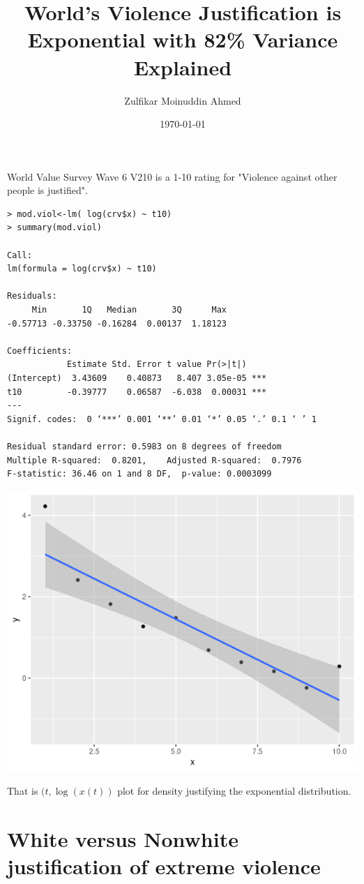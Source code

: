 \documentclass{amsart}
\title{World's Violence Justification is Exponential with 82\% Variance Explained}
\author{Zulfikar Moinuddin Ahmed}
\date{\today}
\begin{document}
\maketitle

World Value Survey Wave 6 V210 is a 1-10 rating for "Violence against other people is justified".


\begin{verbatim}
> mod.viol<-lm( log(crv$x) ~ t10)
> summary(mod.viol)

Call:
lm(formula = log(crv$x) ~ t10)

Residuals:
     Min       1Q   Median       3Q      Max 
-0.57713 -0.33750 -0.16284  0.00137  1.18123 

Coefficients:
            Estimate Std. Error t value Pr(>|t|)    
(Intercept)  3.43609    0.40873   8.407 3.05e-05 ***
t10         -0.39777    0.06587  -6.038  0.00031 ***
---
Signif. codes:  0 ‘***’ 0.001 ‘**’ 0.01 ‘*’ 0.05 ‘.’ 0.1 ‘ ’ 1

Residual standard error: 0.5983 on 8 degrees of freedom
Multiple R-squared:  0.8201,	Adjusted R-squared:  0.7976 
F-statistic: 36.46 on 1 and 8 DF,  p-value: 0.0003099
\end{verbatim}

\includegraphics[scale=0.7]{violjustexp.png}

That is $(t,\log(x(t))$ plot for density justifying the exponential distribution.

\section{White versus Nonwhite justification of extreme violence}
\end{document}
